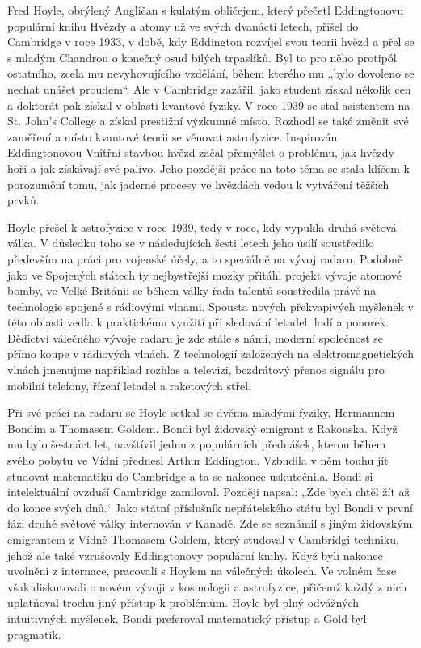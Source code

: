   Fred Hoyle, obrýlený Angličan s kulatým obličejem, který přečetl Eddingtonovu populární knihu
  Hvězdy a atomy už ve svých dvanácti letech, přišel do Cambridge v roce 1933, v době, kdy Eddington
  rozvíjel svou teorii hvězd a přel se s mladým Chandrou o konečný osud bílých trpaslíků. Byl to pro
  něho protipól ostatního, zcela mu nevyhovujícího vzdělání, během kterého mu „bylo dovoleno se
  nechat unášet proudem“. Ale v Cambridge zazářil, jako student získal několik cen a doktorát pak
  získal v oblasti kvantové fyziky. V roce 1939 se stal asistentem na St. John’s College a získal
  prestižní výzkumné místo. Rozhodl se také změnit své zaměření a místo kvantové teorii se věnovat
  astrofyzice. Inspirován Eddingtonovou Vnitřní stavbou hvězd začal přemýšlet o problému, jak hvězdy
  hoří a jak získávají své palivo. Jeho pozdější práce na toto téma se stala klíčem k porozumění
  tomu, jak jaderné procesy ve hvězdách vedou k vytváření těžších prvků. 

  Hoyle přešel k astrofyzice v roce 1939, tedy v roce, kdy vypukla druhá světová válka. V důsledku
  toho se v následujících šesti letech jeho úsilí soustředilo především na práci pro vojenské účely,
  a to speciálně na vývoj radaru. Podobně jako ve Spojených státech ty nejbystřejší mozky přitáhl
  projekt vývoje atomové bomby, ve Velké Británii se během války řada talentů soustředila právě na
  technologie spojené s rádiovými vlnami. Spousta nových překvapivých myšlenek v této oblasti vedla
  k praktickému využití při sledování letadel, lodí a ponorek. Dědictví válečného vývoje radaru je
  zde stále s námi, moderní společnost se přímo koupe v rádiových vlnách. Z technologií založených
  na elektromagnetických vlnách jmenujme například rozhlas a televizi, bezdrátový přenos signálu pro
  mobilní telefony, řízení letadel a raketových střel. 

  Při své práci na radaru se Hoyle setkal se dvěma mladými fyziky, Hermannem Bondim a Thomasem
  Goldem. Bondi byl židovský emigrant z Rakouska. Když mu bylo šestnáct let, navštívil jednu z
  populárních přednášek, kterou během svého pobytu ve Vídni přednesl Arthur Eddington. Vzbudila v
  něm touhu jít studovat matematiku do Cambridge a ta se nakonec uskutečnila. Bondi si intelektuální
  ovzduší Cambridge zamiloval. Později napsal: „Zde bych chtěl žít až do konce svých dnů.“ Jako
  státní příslušník nepřátelského státu byl Bondi v první fázi druhé světové války internován v
  Kanadě. Zde se seznámil s jiným židovským emigrantem z Vídně Thomasem Goldem, který studoval v
  Cambridgi techniku, jehož ale také vzrušovaly Eddingtonovy populární knihy. Když byli nakonec
  uvolněni z internace, pracovali s Hoylem na válečných úkolech. Ve volném čase však diskutovali o
  novém vývoji v kosmologii a astrofyzice, přičemž každý z nich uplatňoval trochu jiný přístup k
  problémům. Hoyle byl plný odvážných intuitivných myšlenek, Bondi preferoval matematický přístup a
  Gold byl pragmatik. 

